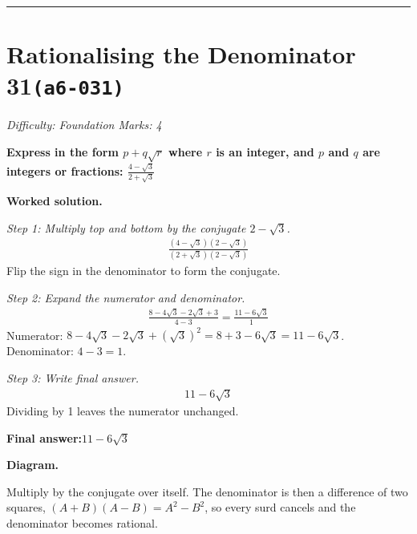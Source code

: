 \documentclass[11pt]{article}
\newcommand{\question}[1]{\par\medskip\noindent\textbf{#1}\par}
\begin{document}
\medskip\hrule

\section*{Rationalising the Denominator 31\quad\small\texttt{(a6-031)}}
\textit{Difficulty: Foundation \quad\textbar\quad Marks: 4}

\question{Express in the form \( p + q\sqrt{r} \) where \( r \) is an integer, and \( p \) and \( q \) are integers or fractions: \( \frac{4 - \sqrt{3}}{2 + \sqrt{3}} \)}

\textbf{Worked solution.}

\textit{Step 1: Multiply top and bottom by the conjugate \( 2 - \sqrt{3} \).}
\[\begin{gathered}
\frac{(4 - \sqrt{3})(2 - \sqrt{3})}{(2 + \sqrt{3})(2 - \sqrt{3})}
\end{gathered}\]
Flip the sign in the denominator to form the conjugate.

\textit{Step 2: Expand the numerator and denominator.}
\[\begin{gathered}
\frac{8 - 4\sqrt{3} - 2\sqrt{3} + 3}{4 - 3} = \frac{11 - 6\sqrt{3}}{1}
\end{gathered}\]
Numerator: \( 8 - 4\sqrt{3} - 2\sqrt{3} + (\sqrt{3})^2 = 8 + 3 - 6\sqrt{3} = 11 - 6\sqrt{3} \). Denominator: \( 4 - 3 = 1 \).

\textit{Step 3: Write final answer.}
\[\begin{gathered}
11 - 6\sqrt{3}
\end{gathered}\]
Dividing by 1 leaves the numerator unchanged.

\begin{answerbox}
\textbf{Final answer:}\quad \(\displaystyle 11 - 6\sqrt{3}\)
\end{answerbox}
\textbf{Diagram.}

\begin{center}
\end{center}
\small Multiply by the conjugate over itself. The denominator is then a difference of two squares, $(A+B)(A-B)=A^{2}-B^{2}$, so every surd cancels and the denominator becomes rational.\normalsize
\end{document}
